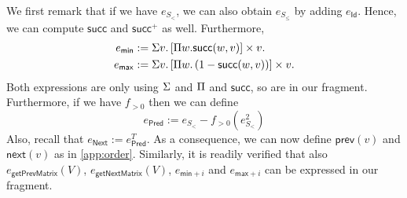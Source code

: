 We first remark that if we have $e_{S_{<}}$, we can also obtain
 $e_{S_{\leq}}$ by adding $e_{\mathsf{Id}}$. Hence,
%
%
we can compute $\mathsf{succ}$ and $\mathsf{succ}^+$ as well. Furthermore, 
\begin{align*}
  e_{\mathsf{min}}&:=\Sigma v. \left[ \Pi w. \mathsf{succ}(w,v)\right] \times v. \\
  e_{\mathsf{max}}&:=\Sigma v. \left[ \Pi w. \left( 1-\mathsf{succ}(w,v) \right) \right] \times v.
\end{align*}
Both expressions are only using $\Sigma$ and $\Pi$ and $\mathsf{succ}$, so are in our fragment.
Furthermore, if we have $f_{>0}$ then we can define
$$
e_{\mathsf{Pred}}:= e_{S_{<}}- f_{>0}(e_{S_{<}}^2)
$$
Also, recall that  $e_{\mathsf{Next}}:=e_{\mathsf{Pred}}^T$. As a consequence, 
we can now define $\mathsf{prev}(v)$ and $\mathsf{next}(v)$ as in \ref{app:order}. Similarly,
it is readily verified that also $e_{\mathsf{getPrevMatrix}}(V)$,
$e_{\mathsf{getNextMatrix}}(V)$, $e_{\mathsf{min}+i}$ and $e_{\mathsf{max}+i}$ can be expressed
in our fragment.



